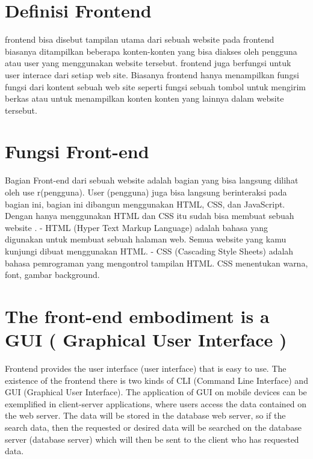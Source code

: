 \section{Definisi Frontend}
frontend bisa disebut tampilan utama dari sebuah website pada frontend biasanya ditampilkan beberapa konten-konten yang bisa diakses oleh pengguna atau user yang menggunakan website tersebut. frontend juga berfungsi untuk user interace dari setiap web site. Biasanya frontend hanya menampilkan fungsi fungsi dari kontent sebuah web site seperti fungsi sebuah tombol untuk mengirim berkas atau untuk menampilkan konten konten yang lainnya dalam website tersebut.

\section{Fungsi Front-end}
Bagian Front-end dari sebuah website adalah bagian yang bisa langsung dilihat oleh use r(pengguna). User (pengguna) juga bisa langsung berinteraksi pada bagian ini, bagian ini dibangun menggunakan HTML, CSS, dan JavaScript. Dengan hanya menggunakan HTML dan CSS itu sudah bisa membuat sebuah website .
- HTML (Hyper Text Markup Language) adalah bahasa yang digunakan untuk membuat sebuah halaman web. Semua website yang kamu kunjungi dibuat menggunakan HTML.
- CSS (Cascading Style Sheets) adalah bahasa pemrograman yang mengontrol tampilan HTML. CSS menentukan warna, font, gambar background.


\section{The front-end embodiment is a GUI ( Graphical User Interface )}
Frontend provides the user interface (user interface) that is easy to use. The existence of the frontend there is two kinds of CLI (Command Line Interface) and GUI (Graphical User Interface). The application of GUI on mobile devices can be exemplified in client-server applications, where users access the data contained on the web server. The data will be stored in the database web server, so if the search data, then the requested or desired data will be searched on the database server (database server) which will then be sent to the client who has requested data.